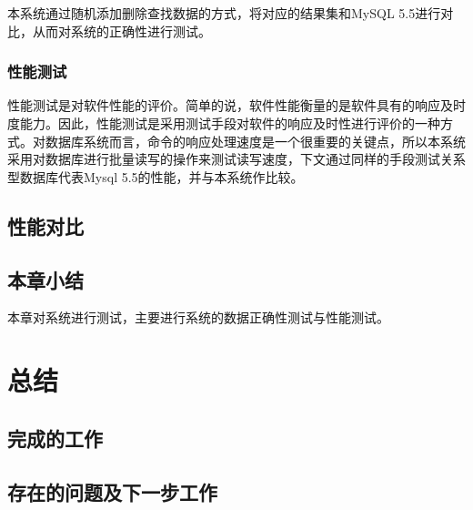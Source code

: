 \documentclass{zjutthesis}
\begin{document}
本系统通过随机添加删除查找数据的方式，将对应的结果集和MySQL 5.5进行对比，从而对系统的正确性进行测试。

\subsection{性能测试}
性能测试是对软件性能的评价。简单的说，软件性能衡量的是软件具有的响应及时度能力。因此，性能测试是采用测试手段对软件的响应及时性进行评价的一种方式。对数据库系统而言，命令的响应处理速度是一个很重要的关键点，所以本系统采用对数据库进行批量读写的操作来测试读写速度，下文通过同样的手段测试关系型数据库代表Mysql 5.5的性能，并与本系统作比较。

\section{性能对比} %

\section{本章小结}
本章对系统进行测试，主要进行系统的数据正确性测试与性能测试。

\chapter{总结}
\section{完成的工作}

\section{存在的问题及下一步工作}

\backmatter


\nocite{*}                                   %


\appendix

\end{document}
